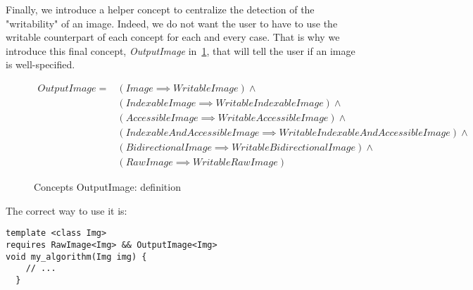 Finally, we introduce a helper concept to centralize the detection of the "writability" of an image. Indeed, we do not
want the user to have to use the writable counterpart of each concept for each and every case. That is why we introduce
this final concept, \emph{OutputImage} in~\cref{table:concept.image.expressions.8}, that will tell the user if an image
is well-specified.

\begin{figure}[!htbp]
  \begin{scriptsize}
    \begin{equation}
      \begin{aligned}
        OutputImage ={} & (Image \implies WritableImage) \wedge                                             \\
                        & (IndexableImage \implies WritableIndexableImage) \wedge                           \\
                        & (AccessibleImage \implies WritableAccessibleImage) \wedge                         \\
                        & (IndexableAndAccessibleImage \implies WritableIndexableAndAccessibleImage) \wedge \\
                        & (BidirectionalImage \implies WritableBidirectionalImage) \wedge                   \\
                        & (RawImage \implies WritableRawImage)
      \end{aligned}
    \end{equation}
    \smallskip

    \caption{Concepts OutputImage: definition}
  \end{scriptsize}
  \label{table:concept.image.expressions.8}
\end{figure}

The correct way to use it is:
\begin{verbatim}
template <class Img>
requires RawImage<Img> && OutputImage<Img>
void my_algorithm(Img img) {
    // ...
  }
\end{verbatim}
